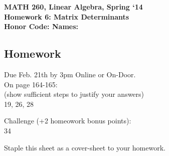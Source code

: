 \documentclass{article}
\begin{document}
\begin{flushleft}
	\bfseries{MATH 260, Linear Algebra, Spring `14}\\
	\bfseries{Homework 6:  Matrix Determinants}\\
	\bfseries{Honor Code:} \hspace{3.5in}\bfseries{Names:}\\
\end{flushleft}
\begin{flushleft}
\vspace{.5in}

\section*{Homework}
\LARGE Due Feb. 21th by 3pm Online or On-Door.\\
\normalsize
\vspace{0.25in}
On page 164-165:\\
(show sufficient steps to justify your answers)\\
19, 26, 28\\
\vspace{0.5in}

\Large
Challenge (+2 homeowork bonus points):\\
\normalsize
34

\vspace{1in}
\Large
Staple this sheet as a cover-sheet to your homework.

\end{flushleft}
\end{document}
